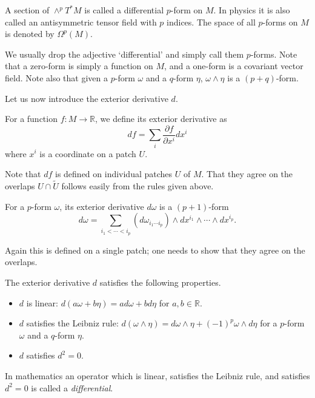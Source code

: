 \documentclass[12pt]{article}
\numberwithin{equation}{section}
\theoremstyle{remark}
\def\bR{\mathbb{R}}
\begin{document}
\begin{definition}
A section of $\wedge^p T^*M$ is called a differential $p$-form on $M$.
In physics it is also called an antisymmetric tensor field with $p$ indices.
The space of all $p$-forms on $M$ is denoted by $\Omega^p(M)$.
\end{definition}

We usually drop the adjective `differential' and simply call them $p$-forms.
Note that a zero-form is simply a function on $M$,
and a one-form is a covariant vector field.
Note also that given a $p$-form $\omega$ and a $q$-form $\eta$,
$\omega\wedge\eta$ is a $(p+q)$-form.


Let us now introduce the exterior derivative $d$.
\begin{definition}
For a function $f:M\to \bR$, we define its exterior derivative as \begin{equation}
df = \sum_i \frac{\partial f}{\partial x^i} dx^i
\end{equation} where $x^i$ is a coordinate on a patch $U$.
\end{definition}
Note that $df$ is defined on individual patches $U$ of $M$.
That they agree on the overlaps $U\cap \tilde U$ follows easily from the rules given above.

\begin{definition}
  For a $p$-form $\omega$, its exterior derivative $d\omega$ is a $(p+1)$-form \begin{equation}
    d\omega = \sum_{i_1<\cdots<i_p} (d\omega_{i_1\cdots i_p}) \wedge dx^{i_1}\wedge \cdots \wedge dx^{i_p}.
  \end{equation}
\end{definition}
Again this is defined on a single patch; one needs to show that they agree on the overlaps.

\begin{proposition}
  The exterior derivative $d$ satisfies the following properties.
  \begin{itemize}
    \item $d$ is linear: $d(a \omega + b \eta) = a d\omega + b d\eta$ for  $a,b\in \bR$.
    \item $d$ satisfies the Leibniz rule: $d(\omega\wedge \eta) = d\omega \wedge \eta + (-1)^p \omega \wedge d\eta$ for a $p$-form $\omega$ and a $q$-form $\eta$.
    \item $d$ satisfies $d^2=0$. 
  \end{itemize}
\end{proposition}
In mathematics an operator which is linear, satisfies the Leibniz rule, and satisfies $d^2=0$ is called a \emph{differential}.
\end{document}

